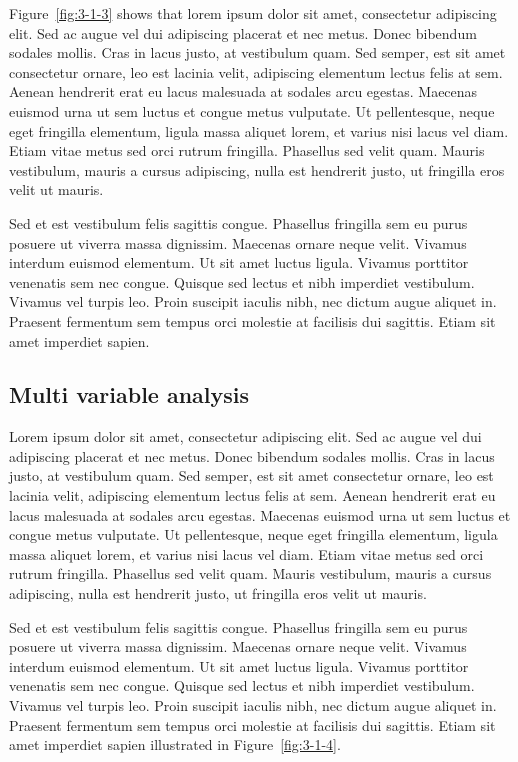Figure~\ref{fig:3-1-3} shows that lorem ipsum dolor sit amet, consectetur adipiscing elit. Sed ac augue vel dui 
adipiscing placerat et nec metus. Donec bibendum sodales mollis. Cras in lacus 
justo, at vestibulum quam. Sed semper, est sit amet consectetur ornare, leo est 
lacinia velit, adipiscing elementum lectus felis at sem. Aenean hendrerit erat eu 
lacus malesuada at sodales arcu egestas. Maecenas euismod urna ut sem luctus et 
congue metus vulputate. Ut pellentesque, neque eget fringilla elementum, ligula 
massa aliquet lorem, et varius nisi lacus vel diam. Etiam vitae metus sed orci 
rutrum fringilla. Phasellus sed velit quam. Mauris vestibulum, mauris a cursus 
adipiscing, nulla est hendrerit justo, ut fringilla eros velit ut mauris.

Sed et est vestibulum felis sagittis congue. Phasellus fringilla sem eu purus 
posuere ut viverra massa dignissim. Maecenas ornare neque velit. Vivamus interdum 
euismod elementum. Ut sit amet luctus ligula. Vivamus porttitor venenatis sem nec 
congue. Quisque sed lectus et nibh imperdiet vestibulum. Vivamus vel turpis leo. 
Proin suscipit iaculis nibh, nec dictum augue aliquet in. Praesent fermentum sem 
tempus orci molestie at facilisis dui sagittis. Etiam sit amet imperdiet sapien.

\subsection{Multi variable analysis}

Lorem ipsum dolor sit amet, consectetur adipiscing elit. Sed ac augue vel dui 
adipiscing placerat et nec metus. Donec bibendum sodales mollis. Cras in lacus 
justo, at vestibulum quam. Sed semper, est sit amet consectetur ornare, leo est 
lacinia velit, adipiscing elementum lectus felis at sem. Aenean hendrerit erat eu 
lacus malesuada at sodales arcu egestas. Maecenas euismod urna ut sem luctus et 
congue metus vulputate. Ut pellentesque, neque eget fringilla elementum, ligula 
massa aliquet lorem, et varius nisi lacus vel diam. Etiam vitae metus sed orci 
rutrum fringilla. Phasellus sed velit quam. Mauris vestibulum, mauris a cursus 
adipiscing, nulla est hendrerit justo, ut fringilla eros velit ut mauris.

Sed et est vestibulum felis sagittis congue. Phasellus fringilla sem eu purus 
posuere ut viverra massa dignissim. Maecenas ornare neque velit. Vivamus interdum 
euismod elementum. Ut sit amet luctus ligula. Vivamus porttitor venenatis sem nec 
congue. Quisque sed lectus et nibh imperdiet vestibulum. Vivamus vel turpis leo. 
Proin suscipit iaculis nibh, nec dictum augue aliquet in. Praesent fermentum sem 
tempus orci molestie at facilisis dui sagittis. Etiam sit amet imperdiet sapien illustrated in Figure~\ref{fig:3-1-4}.


